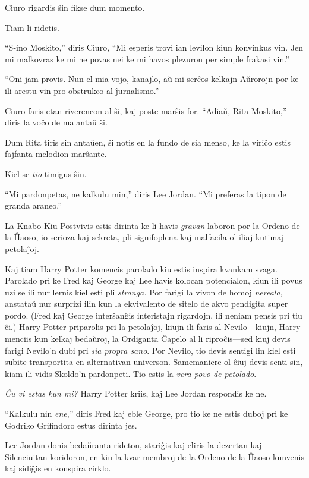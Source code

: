 Ciuro rigardis ŝin fikse dum momento.

Tiam li ridetis.

``S-ino Moskito,'' diris Ciuro, ``Mi esperis trovi ian levilon kiun
konvinkus vin. Jen mi malkovras ke mi ne povas nei ke mi havos
plezuron per simple frakasi vin.''

``Oni jam provis. Nun el mia vojo, kanajlo, aŭ mi serĉos kelkajn
Aŭrorojn por ke ili arestu vin pro obstrukco al ĵurnalismo.''

Ciuro faris etan riverencon al ŝi, kaj poste marŝis for. ``Adiaŭ, Rita
Moskito,'' diris la voĉo de malantaŭ ŝi.

Dum Rita tiris sin antaŭen, ŝi notis en la fundo de sia menso, ke la
viriĉo estis fajfanta melodion marŝante.

Kiel se \emph{tio} timigus ŝin.


``Mi pardonpetas, ne kalkulu min,'' diris Lee Jordan. ``Mi preferas
la tipon de granda araneo.''

La Knabo-Kiu-Postvivis estis dirinta ke li havis \emph{gravan} laboron
por la Ordeno de la Ĥaoso, io serioza kaj sekreta, pli signifoplena
kaj malfacila ol iliaj kutimaj petolaĵoj.

Kaj tiam Harry Potter komencis parolado kiu estis inspira kvankam
svaga. Parolado pri ke Fred kaj George kaj Lee havis kolocan
potencialon, kiun ili povus uzi se ili nur lernis kiel esti pli
\emph{stranga.} Por farigi la vivon de homoj \emph{nereala,} anstataŭ
nur surprizi ilin kun la ekvivalento de sitelo de akvo pendigita super
pordo. (Fred kaj George interŝanĝis interistajn rigardojn, ili neniam
pensis pri tiu ĉi.) Harry Potter priparolis pri la petolaĵoj, kiujn
ili faris al Nevilo—kiujn, Harry menciis kun kelkaj bedaŭroj, la
Ordiganta Ĉapelo al li riproĉis—sed kiuj devis farigi Nevilo'n dubi
pri \emph{sia propra sano}. Por Nevilo, tio devis sentigi lin kiel
esti subite transportita en alternativan universon. Samemaniere ol
ĉiuj devis senti sin, kiam ili vidis Skoldo'n pardonpeti. Tio estis la
\emph{vera povo de petolado}.

\emph{Ĉu vi estas kun mi?} Harry Potter kriis, kaj Lee Jordan
respondis ke ne.

``Kalkulu nin \emph{ene},'' diris Fred kaj eble George, pro tio ke ne
estis duboj pri ke Godriko Grifindoro estus dirinta jes.

Lee Jordan donis bedaŭranta rideton, stariĝis kaj eliris la dezertan
kaj Silenciuitan koridoron, en kiu la kvar membroj de la Ordeno de la
Ĥaoso kunvenis kaj sidiĝis en konspira cirklo.

